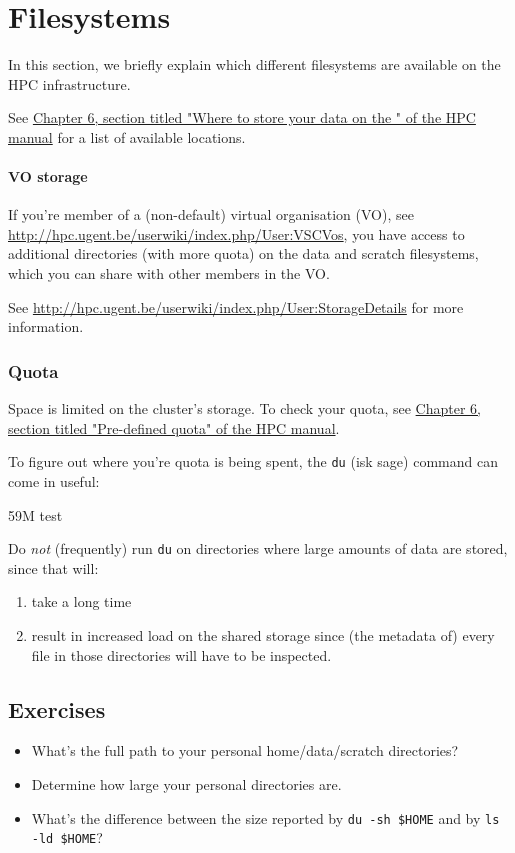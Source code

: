 \chapter{Filesystems}

In this section, we briefly explain which different filesystems are available on
the \gls{HPC} infrastructure.

See \href{\HPCManualURL#predefined-user-directories}{Chapter 6, section titled "Where to store your data on the \hpc{}" of the HPC manual}
for a list of available locations.

\subsubsection{VO storage}

If you're member of a (non-default) virtual organisation (VO), see
\url{http://hpc.ugent.be/userwiki/index.php/User:VSCVos}, you have access to
additional directories (with more quota) on the data and \gls{scratch} filesystems,
which you can share with other members in the VO.

See \url{http://hpc.ugent.be/userwiki/index.php/User:StorageDetails} for more
information.

\subsection{Quota}

Space is limited on the cluster's storage. To check your quota, see
\href{\HPCManualURL#predefined-quotas}{Chapter 6, section titled "Pre-defined quota" of the HPC manual}.

To figure out where you're quota is being spent, the \lstinline|du| (isk sage)
command can come in useful:

\begin{prompt}
59M   test
\end{prompt}

Do \emph{not} (frequently) run \lstinline|du| on directories where large amounts
of data are stored, since that will:
\begin{enumerate}
    \item take a long time
    \item result in increased
        load on the shared storage since (the metadata of) every file in those directories
        will have to be inspected.
\end{enumerate}

\section{Exercises}

\begin{itemize}
    \item What's the full path to your personal home/data/scratch directories?
    \item Determine how large your personal directories are.
    \item What's the difference between the size reported by \lstinline|du -sh $HOME|
        and by \lstinline|ls -ld $HOME|?
\end{itemize}
